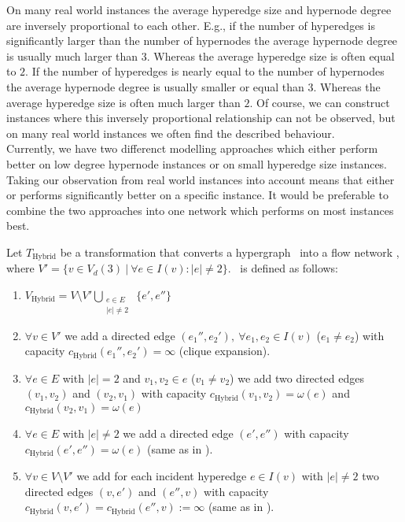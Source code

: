 On many real world instances the average hyperedge size and hypernode degree are inversely
proportional to each other. E.g., if the number of hyperedges is significantly larger than the
number of hypernodes the average hypernode degree is usually much larger than $3$. Whereas
the average hyperedge size is often equal to $2$. If the number of hyperedges is nearly equal
to the number of hypernodes the average hypernode degree is usually smaller or equal than $3$. Whereas
the average hyperedge size is often much larger than $2$. Of course, we can construct instances
where this inversely proportional relationship can not be observed, but on many real world instances
we often find the described behaviour. \\
Currently, we have two differenct modelling approaches which either perform better on low degree
hypernode instances or on small hyperedge size instances. Taking our observation from real world instances 
into account means that either  or  performs significantly better on
a specific instance. It would be preferable to combine the two approaches into one network 
which performs on most instances best. \\

\begin{definition}
Let $T_{\text{Hybrid}}$ be a transformation that converts a hypergraph \HypergraphDef~into 
a flow network \Hybrid, where $V' = \{v \in V_d(3)\ |\ \forall e \in I(v): |e| \neq 2\}$. 
\ShortHybrid~is defined as follows:
\begin{enumerate}
\item $V_{\text{Hybrid}} = V\setminus V' \bigcup\limits_{\substack{e \in E \\ |e| \neq 2}}\ \{e', e''\}$
\item $\forall v \in V'$ we add a directed edge $(e_1'', e_2'),\ \forall e_1, e_2 \in I(v)$ 
      ($e_1 \neq e_2$) with capacity $c_{\text{Hybrid}}(e_1'', e_2') = \infty$ (clique expansion).
\item $\forall e \in E$ with $|e| = 2$ and $v_1,v_2 \in e$ ($v_1 \neq v_2$) we add 
      two directed edges $(v_1,v_2)$ and $(v_2,v_1)$ with capacity $c_{\text{Hybrid}}(v_1,v_2) = \omega(e)$
      and $c_{\text{Hybrid}}(v_2,v_1) = \omega(e)$
\item $\forall e \in E$ with $|e| \neq 2$ we add a directed edge $(e',e'')$
      with capacity $c_{\text{Hybrid}}(e',e'') = \omega(e)$ (same as in ).
\item $\forall v \in V\setminus V'$ we add for each incident hyperedge $e \in I(v)$ with $|e| \neq 2$ 
      two directed edges $(v,e')$ and $(e'',v)$ with capacity 
      $c_{\text{Hybrid}}(v,e') = c_{\text{Hybrid}}(e'',v) := \infty$ (same as in ).
\end{enumerate} 
\end{definition}

